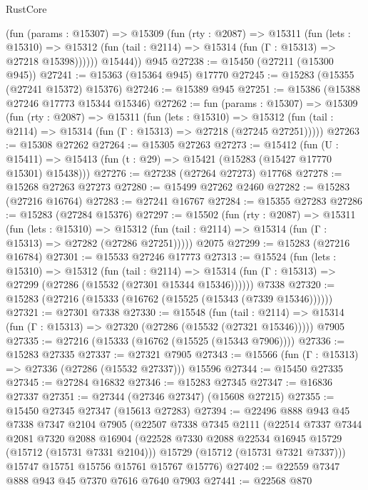 \begin{lexlean}{RustCore}
\begin{coremodule}
          (fun (params : @15307) =>
          @15309
            (fun (rty : @2087) =>
            @15311
              (fun (lets : @15310) =>
              @15312 (fun (tail : @2114) => @15314 (fun (Γ : @15313) => @27218 @15398))))))
        @15444))
    @945
@27238 := @15450 (@27211 (@15300 @945))
@27241 := @15363 (@15364 @945) @17770
@27245 := @15283 (@15355 (@27241 @15372) @15376)
@27246 := @15389 @945
@27251 := @15386 (@15388 @27246 @17773 @15344 @15346)
@27262 := fun (params : @15307) =>
  @15309
    (fun (rty : @2087) =>
    @15311
      (fun (lets : @15310) =>
      @15312 (fun (tail : @2114) => @15314 (fun (Γ : @15313) => @27218 (@27245 @27251)))))
@27263 := @15308 @27262
@27264 := @15305 @27263
@27273 := @15412
    (fun (U : @15411) => @15413 (fun (t : @29) => @15421 (@15283 (@15427 @17770 @15301) @15438)))
@27276 := @27238 (@27264 @27273) @17768
@27278 := @15268 @27263 @27273
@27280 := @15499 @27262 @2460
@27282 := @15283 (@27216 @16764)
@27283 := @27241 @16767
@27284 := @15355 @27283
@27286 := @15283 (@27284 @15376)
@27297 := @15502
    (fun (rty : @2087) =>
    @15311
      (fun (lets : @15310) =>
      @15312 (fun (tail : @2114) => @15314 (fun (Γ : @15313) => @27282 (@27286 @27251)))))
    @2075
@27299 := @15283 (@27216 @16784)
@27301 := @15533 @27246 @17773
@27313 := @15524
    (fun (lets : @15310) =>
    @15312
      (fun (tail : @2114) =>
      @15314 (fun (Γ : @15313) => @27299 (@27286 (@15532 (@27301 @15344 @15346))))))
    @7338
@27320 := @15283 (@27216 (@15333 (@16762 (@15525 (@15343 (@7339 @15346))))))
@27321 := @27301 @7338
@27330 := @15548
    (fun (tail : @2114) => @15314 (fun (Γ : @15313) => @27320 (@27286 (@15532 (@27321 @15346)))))
    @7905
@27335 := @27216 (@15333 (@16762 (@15525 (@15343 @7906))))
@27336 := @15283 @27335
@27337 := @27321 @7905
@27343 := @15566 (fun (Γ : @15313) => @27336 (@27286 (@15532 @27337))) @15596
@27344 := @15450 @27335
@27345 := @27284 @16832
@27346 := @15283 @27345
@27347 := @16836 @27337
@27351 := @27344 (@27346 @27347) (@15608 @27215)
@27355 := @15450 @27345 @27347 (@15613 @27283)
@27394 := @22496
    @888
    @943
    @45
    @7338
    @7347
    @2104
    @7905
    (@22507
      @7338
      @7345
      @2111
      (@22514
        @7337
        @7344
        @2081
        @7320
        @2088
        @16904
        (@22528 @7330 @2088 @22534 @16945 @15729 (@15712 (@15731 @7331 @2104)))
        @15729
        (@15712 (@15731 @7321 @7337)))
      @15747
      @15751
      @15756
      @15761
      @15767
      @15776)
@27402 := @22559 @7347 @888 @943 @45 @7370 @7616 @7640 @7903
@27441 := @22568
    @870

\end{coremodule}
\end{lexlean}
